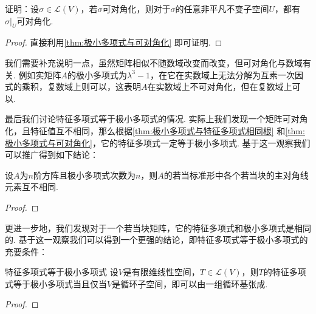 \begin{example}{}{}
    证明：设$\sigma\in \mathcal{L}(V)$，若$\sigma$可对角化，则对于$\sigma$的任意非平凡不变子空间$U$，都有$\sigma\vert_U$可对角化.
\end{example}

\begin{proof}
    直接利用\autoref{thm:极小多项式与可对角化} 即可证明.
\end{proof}

我们需要补充说明一点，虽然矩阵相似不随数域改变而改变，但可对角化与数域有关. 例如实矩阵$A$的极小多项式为$\lambda^3-1$，在它在实数域上无法分解为互素一次因式的乘积，复数域上则可以，这表明$A$在实数域上不可对角化，但在复数域上可以.

最后我们讨论特征多项式等于极小多项式的情况. 实际上我们发现一个矩阵可对角化，且特征值互不相同，那么根据\autoref{thm:极小多项式与特征多项式相同根} 和\autoref{thm:极小多项式与可对角化}，它的特征多项式一定等于极小多项式. 基于这一观察我们可以推广得到如下结论：
\begin{example}{}{}
    设$A$为$n$阶方阵且极小多项式次数为$n$，则$A$的若当标准形中各个若当块的主对角线元素互不相同.
\end{example}

\begin{proof}

\end{proof}

更进一步地，我们发现对于一个若当块矩阵，它的特征多项式和极小多项式是相同的. 基于这一观察我们可以得到一个更强的结论，即特征多项式等于极小多项式的充要条件：
\begin{theorem}{}{特征多项式等于极小多项式}
    设$V$是有限维线性空间，$T\in \mathcal{L}(V)$，则$T$的特征多项式等于极小多项式当且仅当$V$是循环子空间，即可以由一组循环基张成.
\end{theorem}
\begin{proof}

\end{proof}

\begin{summary}

\end{summary}

